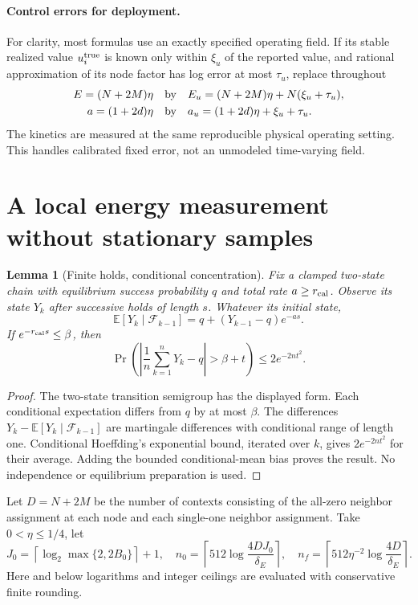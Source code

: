 \documentclass[11pt]{article}
\newtheorem{lemma}[theorem]{Lemma}
\begin{document}
\paragraph{Control errors for deployment.}
For clarity, most formulas use an exactly specified operating field. If its stable realized value $u_i^{\rm true}$ is known only within $\xi_u$ of the reported value, and rational approximation of its node factor has log error at most $\tau_u$, replace throughout
\begin{equation}
 \begin{aligned}
 E=(N+2M)\eta&\quad\hbox{by}\quad E_u=(N+2M)\eta+N(\xi_u+\tau_u),\\
 a=(1+2d)\eta&\quad\hbox{by}\quad a_u=(1+2d)\eta+\xi_u+\tau_u.
 \end{aligned}
 \label{eq:field-error}
\end{equation}
The kinetics are measured at the same reproducible physical operating setting. This handles calibrated fixed error, not an unmodeled time-varying field.

\section{A local energy measurement without stationary samples}
\label{sec:balance}
\begin{lemma}[Finite holds, conditional concentration]
Fix a clamped two-state chain with equilibrium success probability $q$ and total rate $a\ge r_{\rm cal}$. Observe its state $Y_k$ after successive holds of length $s$. Whatever its initial state,
\[
 \mathbb E[Y_k\mid\mathcal F_{k-1}]=q+(Y_{k-1}-q)e^{-as}.
\]
If $e^{-r_{\rm cal}s}\le\beta$, then
\begin{equation}
 \Pr\left(\left|\frac1n\sum_{k=1}^nY_k-q\right|>\beta+t\right)\le2e^{-2nt^2}.
 \label{eq:martingale}
\end{equation}
\end{lemma}
\begin{proof}
The two-state transition semigroup has the displayed form. Each conditional expectation differs from $q$ by at most $\beta$. The differences $Y_k-\mathbb E[Y_k\mid\mathcal F_{k-1}]$ are martingale differences with conditional range of length one. Conditional Hoeffding's exponential bound, iterated over $k$, gives $2e^{-2nt^2}$ for their average. Adding the bounded conditional-mean bias proves the result. No independence or equilibrium preparation is used.
\end{proof}

Let $D=N+2M$ be the number of contexts consisting of the all-zero neighbor assignment at each node and each single-one neighbor assignment. Take $0<\eta\le1/4$, let
\[
 J_0=\left\lceil\log_2\max\{2,2B_0\}\right\rceil+1,
 \quad n_0=\left\lceil512\log\frac{4DJ_0}{\delta_E}\right\rceil,
 \quad n_f=\left\lceil512\eta^{-2}\log\frac{4D}{\delta_E}\right\rceil.
\]
Here and below logarithms and integer ceilings are evaluated with conservative finite rounding.
\end{document}
